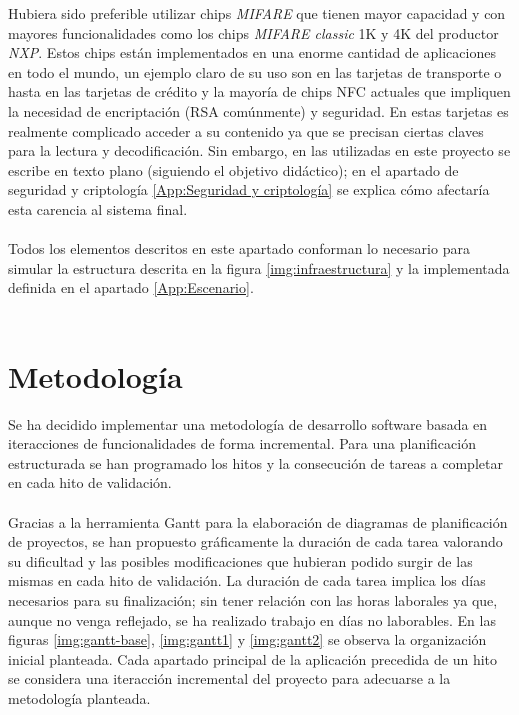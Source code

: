 \documentclass[../PFC.tex]{subfiles}
\begin{document}
Hubiera sido preferible utilizar chips \textit{MIFARE}\cite{mifare} que tienen mayor capacidad y con mayores funcionalidades como los chips \textit{MIFARE classic} 1K y 4K del productor \textit{NXP}. Estos chips están implementados en una enorme cantidad de aplicaciones en todo el mundo, un ejemplo claro de su uso son en las tarjetas de transporte o hasta en las tarjetas de crédito y la mayoría de chips NFC actuales que impliquen la necesidad de encriptación (RSA comúnmente) y seguridad. En estas tarjetas es realmente complicado acceder a su contenido ya que se precisan ciertas claves para la lectura y decodificación. Sin embargo, en las utilizadas en este proyecto se escribe en texto plano (siguiendo el objetivo didáctico); en el apartado de seguridad y criptología \ref{App:Seguridad y criptología} se explica cómo afectaría esta carencia al sistema final. 
\\\\
Todos los elementos descritos en este apartado conforman lo necesario para simular la estructura descrita en la figura \ref{img:infraestructura} y la implementada definida en el apartado \ref{App:Escenario}. 
\\\\

\section{Metodología}
\label{App:Metodología}

Se ha decidido implementar una metodología de desarrollo software basada en iteracciones de funcionalidades de forma incremental. Para una planificación estructurada se han programado los hitos y la consecución de tareas a completar en cada hito de validación.
\\\\
Gracias a la herramienta Gantt\cite{gantt} para la elaboración de diagramas de planificación de proyectos, se han propuesto gráficamente la duración de cada tarea valorando su dificultad y las posibles modificaciones que hubieran podido surgir de las mismas en cada hito de validación. La duración de cada tarea implica los días necesarios para su finalización; sin tener relación con las horas laborales ya que, aunque no venga reflejado, se ha realizado trabajo en días no laborables. En las figuras \ref{img:gantt-base}, \ref{img:gantt1} y \ref{img:gantt2} se observa la organización inicial planteada. Cada apartado principal de la aplicación precedida de un hito se considera una iteracción incremental del proyecto para adecuarse a la metodología planteada.
\end{document}
